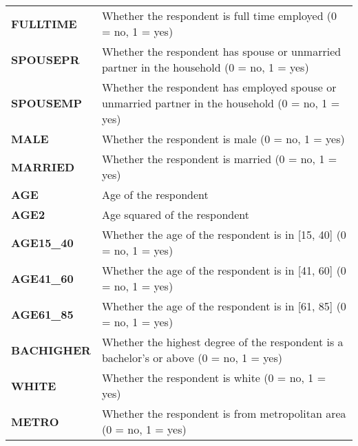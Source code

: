 \documentclass[12pt,a4paper]{article}
\begin{document}
\begin{longtable}{|p{}|p{}|}
\textbf{FULLTIME} &

Whether the respondent is full time employed (0 = no, 1 = yes) \\

\textbf{SPOUSEPR} &

Whether the respondent has spouse or unmarried partner in the household (0 = no, 1 = yes) \\

\textbf{SPOUSEMP} &

Whether the respondent has employed spouse or unmarried partner in the household (0 = no, 1 = yes) \\

\textbf{MALE} &

Whether the respondent is male (0 = no, 1 = yes) \\

\textbf{MARRIED} &

Whether the respondent is married (0 = no, 1 = yes) \\

\textbf{AGE} &

Age of the respondent \\

\textbf{AGE2} &

Age squared of the respondent \\

\textbf{AGE15\_40} &

Whether the age of the respondent is in [15, 40] (0 = no, 1 = yes) \\

\textbf{AGE41\_60} &

Whether the age of the respondent is in [41, 60] (0 = no, 1 = yes) \\

\textbf{AGE61\_85} &

Whether the age of the respondent is in [61, 85] (0 = no, 1 = yes) \\

\textbf{BACHIGHER} &

Whether the highest degree of the respondent is a bachelor's or above (0 = no, 1 = yes) \\

\textbf{WHITE} &

Whether the respondent is white (0 = no, 1 = yes) \\

\textbf{METRO} &

Whether the respondent is from metropolitan area (0 = no, 1 = yes) \\


\end{longtable}
\end{document}
